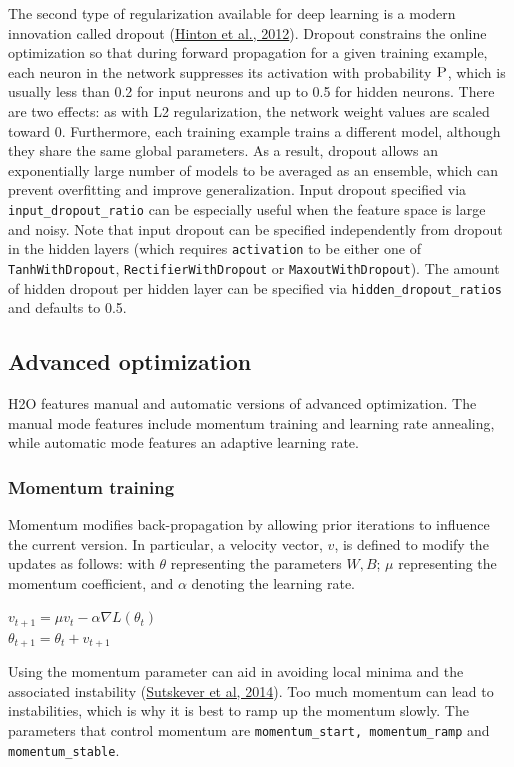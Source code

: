 The second type of regularization available for deep learning is a modern innovation called dropout (\href{http://arxiv.org/pdf/1207.0580.pdf}{Hinton et al., 2012}). %
Dropout constrains the online optimization so that during forward propagation for a given training example, each neuron in the network suppresses its activation with probability $\textsc{P}$, which is usually less than 0.2 for input neurons and up to 0.5 for hidden neurons. There are two effects: as with L2 regularization, the network weight values are scaled toward 0. Furthermore, each training example trains a different model, although they share the same global parameters. As a result, dropout allows an exponentially large number of models to be averaged as an ensemble, which can prevent overfitting and improve generalization. Input dropout specified via \texttt{input\_dropout\_ratio} can be especially useful when the feature space is large and noisy. Note that input dropout can be specified independently from dropout in the hidden layers (which requires \texttt{activation} to be either one of \texttt{TanhWithDropout}, \texttt{RectifierWithDropout} or \texttt{MaxoutWithDropout}). The amount of hidden dropout per hidden layer can be specified via \texttt{hidden\_dropout\_ratios} and defaults to 0.5.

\subsection{Advanced optimization} 
H2O features manual and automatic versions of advanced optimization. The manual mode features include momentum training and learning rate annealing, while automatic mode features an adaptive learning rate.

\subsubsection{Momentum training}
\label{sssec:MomentumTraining}
Momentum modifies back-propagation by allowing prior iterations to influence the current version. In particular, a velocity vector, $v$, is defined to modify the updates as follows: with $\theta$ representing the parameters $W,B$; $\mu$ representing the momentum coefficient, and $\alpha$ denoting the learning rate. 
\begin{center}
$v_{t+1} = \mu v_t - \alpha \nabla L(\theta_t)$
\\
$\theta_{t+1} = \theta_t + v_{t+1}$
\end{center}
Using the momentum parameter can aid in avoiding 
local minima and the associated instability (\href{http://www.cs.toronto.edu/~fritz/absps/momentum.pdf}{Sutskever et al, 2014}). Too much momentum can lead to instabilities, which is why it is best to ramp up the momentum slowly.  The parameters that control momentum are \texttt{momentum\_start, momentum\_ramp} and \texttt{momentum\_stable}.

